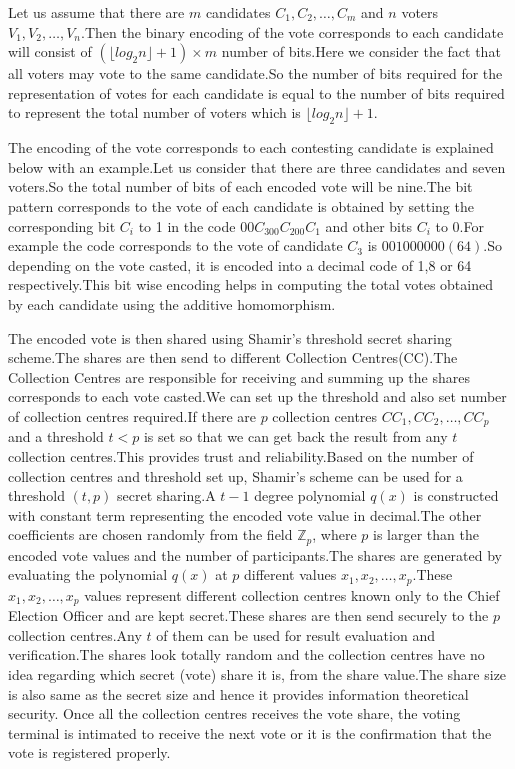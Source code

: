 \documentclass[conference]{IEEEtran}
\begin{document}
Let us assume that there are $m$ candidates $C_1,C_2,\ldots,C_m$ and $n$ voters $V_1,V_2,\ldots,V_n$.Then the binary encoding of the vote corresponds to each candidate will consist of $(\lfloor log_2n \rfloor+1)\times m$ number of bits.Here we consider the fact that all voters may vote to the same candidate.So the number of bits required for the representation of votes for each candidate is equal to the number of bits required to represent the total number of voters which is $\lfloor log_2n \rfloor+1$.

The encoding of the vote corresponds to each contesting candidate is explained below with an example.Let us consider that there are three candidates and seven voters.So the total number of bits of each encoded vote will be nine.The bit pattern corresponds to the vote of each candidate is obtained by setting the corresponding bit $C_i$ to 1 in the code $00C_300C_200C_1$ and other bits $C_i$ to 0.For example the code corresponds to the vote of candidate $C_3$ is $001000000 (64)$.So depending on the vote casted, it is encoded into a decimal code of 1,8 or 64 respectively.This bit wise encoding helps in computing  the total votes obtained by each candidate using the additive homomorphism.
 
The encoded vote is then shared using Shamir's threshold secret sharing scheme.The shares are then send to different Collection Centres(CC).The Collection Centres are responsible for receiving and summing up the shares corresponds to each vote casted.We can set up the threshold and also set number of collection centres required.If there are $p$ collection centres $CC_1,
CC_2,\ldots,CC_p$ and a threshold $t<p$ is set so that we can get back the result from any $t$ collection centres.This provides trust and reliability.Based on the number of collection centres and threshold set up, Shamir's scheme can be used for a threshold $(t,p)$ secret sharing.A $t-1$ degree polynomial $q(x)$ is constructed with constant term representing the encoded vote value in decimal.The other coefficients are chosen randomly from the field $\mathbb{Z}_p$, where $p$ is larger than the encoded vote values and the number of participants.The shares are generated by evaluating the polynomial $q(x)$ at $p$ different values $x_1,x_2,\ldots,x_p$.These $x_1,x_2,\ldots,x_p$ values represent different collection centres known only to the Chief Election Officer and are kept secret.These shares are then send securely to the $p$ collection centres.Any $t$ of them can be used for result evaluation and verification.The shares look totally random and the collection centres have no idea regarding which secret (vote) share it is, from the share value.The share size is also same as the secret size and hence it provides information theoretical security.
Once all the collection centres receives the vote share, the voting terminal is intimated to receive the next vote or it is the confirmation that the vote is registered properly.
\end{document}
